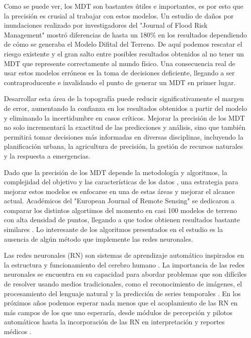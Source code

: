 Como se puede ver, los MDT son bastantes útiles e importantes, es por esto que la precisión es crusial al trabajar con estos modelos. Un estudio de daños por inundaciones realizado por investigadores del "Journal of Flood Risk Management" \cite{MDT-tecnica} mostró diferencias de hasta un 180\% en los resultados dependiendo de cómo se generaba el Modelo Difital del Terreno. 
De aquí podemos rescatar el riesgo existente y el gran salto entre posibles resultados obtenidos al no tener un MDT que represente correctamente al mundo físico. Una consecuencia real de usar estos modelos erróneos es la toma de decisiones deficiente, llegando a ser contraproducente e invalidando el punto de generar un MDT en primer lugar.
\espacio

Desarrollar esta área de la topografía puede reducir significativamente el margen de error, aumentando la confianza en los resultados obtenidos a partir del modelo y eliminando la incertidumbre en casos críticos. Mejorar la precisión de los MDT no solo incrementará la exactitud de las predicciones y análisis, sino que también permitirá tomar decisiones más informadas en diversas disciplinas, incluyendo la planificación urbana, la agricultura de precisión, la gestión de recursos naturales y la respuesta a emergencias.
\espacio

Dado que la precisión de los MDT depende la metodología y algoritmos, la complejidad del objetivo y las características de los datos \cite{MDT-densidad}, una estrategia para mejorar estos modelos es enfocarse en una de estas áreas y mejorar el alcance actual. Académicos del "European Journal of Remote Sensing" se dedicaron a comparar los distintos algortimos del momento en casi 100 modelos de terreno con alta densidad de puntos, llegando a que todos obtienen resultados bastante similares \cite{MDT-algoritmos}. Lo interesante de los algoritmos presentados en el estudio es la ausencia de algún método que implemente las redes neuronales. 
\espacio

Las redes neuronales (RN) son sistemas de aprendizaje automático inspirados en la estructura y funcionamiento del cerebro humano \cite{NN-definition}. La importancia de las redes neuronales se encuentra en su capacidad para abordar problemas que son difíciles de resolver usando medios 
tradicionales, como el reconocimiento de imágenes, el procesamiento del lenguaje natural y la predicción de series temporales \cite{NN-impact}. En los próximos años podemos esperar nada menos que el acoplamiento de las RN en más campos de los que uno esperaría, desde módulos de percepción y pilotos automáticos \cite{NN-ex1} hasta la incorporación de las RN en interpretación y reportes médicos \cite{NN-ex2}.
\espacio


